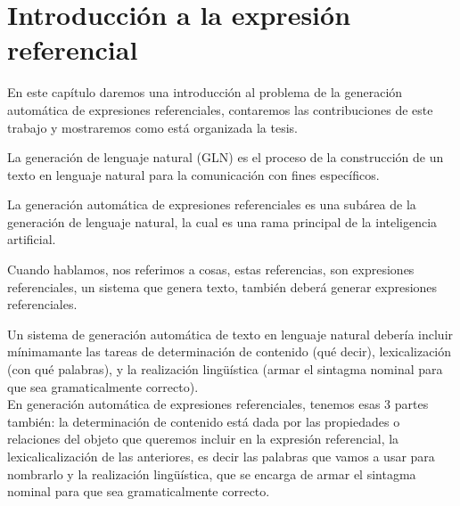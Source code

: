 \chapter{Introducci\'on a la expresi\'on referencial}
\label{sec:intro}

En este cap\'itulo daremos una introducci\'on al problema de la generaci\'on autom\'atica de expresiones referenciales, contaremos las contribuciones de este trabajo y mostraremos como est\'a organizada la tesis.


La generaci\'on de lenguaje natural (GLN) es el proceso de la construcci\'on de un texto en lenguaje natural para la comunicaci\'on con fines espec\'ificos. 

La generaci\'on autom\'atica de expresiones referenciales es una sub\'area de la generaci\'on de lenguaje natural, la cual es una rama principal de la inteligencia artificial.

Cuando hablamos, nos referimos a cosas, estas referencias, son expresiones referenciales, un sistema que genera texto, tambi\'en deber\'a generar expresiones referenciales.


Un sistema de generaci\'on autom\'atica de texto en lenguaje natural deber\'ia incluir m\'inimamante 
las tareas de determinaci\'on de contenido (qu\'e decir), lexicalizaci\'on (con qu\'e palabras), y la realizaci\'on ling\"{u}\'istica (armar el  sintagma nominal para que sea gramaticalmente correcto). \\
En generaci\'on autom\'atica de expresiones referenciales, tenemos esas 3 partes tambi\'en: la determinaci\'on de contenido est\'a dada por las propiedades o relaciones del objeto que queremos incluir en la expresi\'on referencial, la lexicalicalizaci\'on de las anteriores, es decir las palabras que vamos a usar para nombrarlo y la realizaci\'on ling\"u\'istica, que se encarga de armar el sintagma nominal para que sea gramaticalmente correcto.\\

 

\setlength{\unitlength}{1cm}

